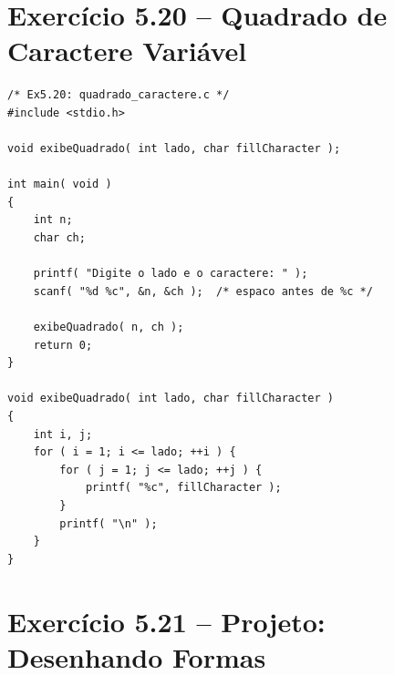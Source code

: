 \documentclass[12pt,a4paper]{article}
\begin{document}
\section{Exercício 5.20 -- Quadrado de Caractere Variável}

\begin{respostabox}
\begin{lstlisting}
/* Ex5.20: quadrado_caractere.c */
#include <stdio.h>

void exibeQuadrado( int lado, char fillCharacter );

int main( void )
{
    int n;
    char ch;

    printf( "Digite o lado e o caractere: " );
    scanf( "%d %c", &n, &ch );  /* espaco antes de %c */

    exibeQuadrado( n, ch );
    return 0;
}

void exibeQuadrado( int lado, char fillCharacter )
{
    int i, j;
    for ( i = 1; i <= lado; ++i ) {
        for ( j = 1; j <= lado; ++j ) {
            printf( "%c", fillCharacter );
        }
        printf( "\n" );
    }
}
\end{lstlisting}
\end{respostabox}

\newpage

\section{Exercício 5.21 -- Projeto: Desenhando Formas}
\end{document}
